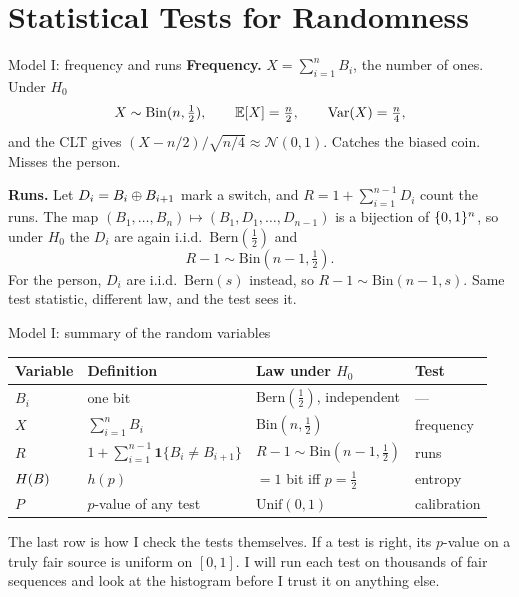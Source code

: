 \documentclass[10pt,aspectratio=169]{beamer}
\newcommand{\Bern}{\mathrm{Bern}}
\newcommand{\Bin}{\mathrm{Bin}}
\newcommand{\Unif}{\mathrm{Unif}}
\newcommand{\Ind}[1]{\mathbf{1}\{#1\}}
\begin{document}
\section[Tests]{Statistical Tests for Randomness}

\begin{frame}{Model I: frequency and runs}
  \textbf{Frequency.} $X = \sum_{i=1}^{n} B_i$, the number of ones.
  Under $H_0$
  \[
    X \sim \Bin(n, \tfrac12),\qquad \Ex{X} = \tfrac n2,\qquad
    \Var{X} = \tfrac n4,
  \]
  and the CLT gives $(X - n/2)/\sqrt{n/4} \approx \mathcal{N}(0,1)$.
  Catches the biased coin. Misses the person.
  \pause
  \medskip

  \textbf{Runs.} Let $D_i = B_i \oplus B_{i+1}$ mark a switch, and
  $R = 1 + \sum_{i=1}^{n-1} D_i$ count the runs.
  The map $(B_1,\dots,B_n) \mapsto (B_1, D_1, \dots, D_{n-1})$ is a
  bijection of $\{0,1\}^n$, so under $H_0$ the $D_i$ are again i.i.d.\
  $\Bern(\tfrac12)$ and
  \[
    R - 1 \sim \Bin(n-1, \tfrac12).
  \]
  For the person, $D_i$ are i.i.d.\ $\Bern(s)$ instead, so
  $R - 1 \sim \Bin(n-1, s)$. Same test statistic, different law, and
  the test sees it.
\end{frame}

\begin{frame}{Model I: summary of the random variables}
  \begin{center}\footnotesize
    \begin{tabular}{@{}llll@{}}
      \toprule
      Variable & Definition & Law under $H_0$ & Test \\
      \midrule
      $B_i$ & one bit & $\Bern(\tfrac12)$, independent & --- \\
      $X$ & $\sum_{i=1}^{n} B_i$ & $\Bin(n,\tfrac12)$ & frequency \\
      $R$ & $1+\sum_{i=1}^{n-1}\Ind{B_i\ne B_{i+1}}$
          & $R-1 \sim \Bin(n-1,\tfrac12)$ & runs \\
      $H\!\left(B\right)$ & $h(p)$ & $=1$ bit iff $p=\tfrac12$ & entropy \\
      $P$ & $p$-value of any test & $\Unif(0,1)$ & calibration \\
      \bottomrule
    \end{tabular}
  \end{center}
  \medskip
  The last row is how I check the tests themselves. If a test is right,
  its $p$-value on a truly fair source is uniform on $[0,1]$. I will
  run each test on thousands of fair sequences and look at the
  histogram before I trust it on anything else.
\end{frame}
\end{document}
